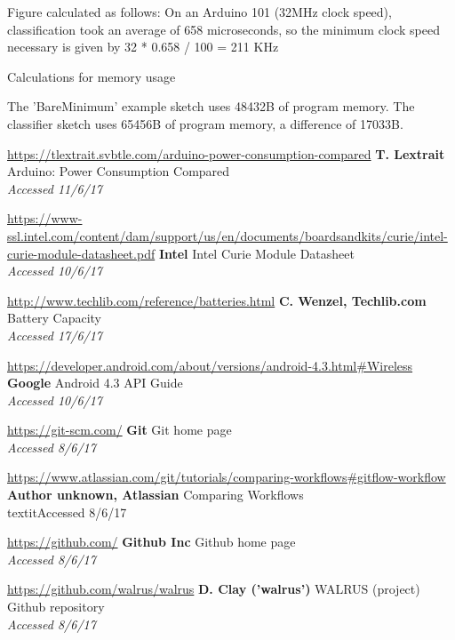 \documentclass[a4paper]{article}
\begin{document}
\begin{thebibliography}{9}

Figure calculated as follows: On an Arduino 101 (32MHz clock speed), classification took an average of 658 microseconds, so the minimum clock speed necessary is given by 32 * 0.658 / 100 = 211 KHz

Calculations for memory usage

The 'BareMinimum' example sketch uses 48432B of program memory. The classifier sketch uses 65456B of program memory, a difference of 17033B.

\url{https://tlextrait.svbtle.com/arduino-power-consumption-compared}
\textbf{T. Lextrait}
Arduino: Power Consumption Compared
\\\textit{Accessed 11/6/17}

\url{https://www-ssl.intel.com/content/dam/support/us/en/documents/boardsandkits/curie/intel-curie-module-datasheet.pdf}
\textbf{Intel}
Intel Curie Module Datasheet
\\\textit{Accessed 10/6/17}

\url{http://www.techlib.com/reference/batteries.html}
\textbf{C. Wenzel, Techlib.com}
Battery Capacity
\\\textit{Accessed 17/6/17}

\url{https://developer.android.com/about/versions/android-4.3.html#Wireless}
\textbf{Google}
Android 4.3 API Guide
\\\textit{Accessed 10/6/17}


\url{https://git-scm.com/}
\textbf{Git }
Git home page
\\\textit{Accessed 8/6/17}

\url{https://www.atlassian.com/git/tutorials/comparing-workflows#gitflow-workflow}
\textbf{Author unknown, Atlassian}
Comparing Workflows
\\textit{Accessed 8/6/17}

\url{https://github.com/}
\textbf{Github Inc}
Github home page
\\\textit{Accessed 8/6/17}

\url{https://github.com/walrus/walrus}
\textbf{D. Clay ('walrus')}
WALRUS (project) Github repository
\\\textit{Accessed 8/6/17}


\end{thebibliography}
\end{document}
